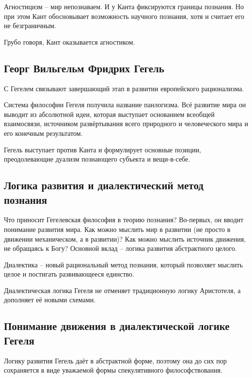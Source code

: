 \documentclass[main.tex]{subfiles}
\begin{document}

Агностицизм -- мир непознаваем.
И у Канта фиксируются границы познания.
Но при этом Кант обосновывает возможность научного познания, хотя и считает его не безграничным.

Грубо говоря, Кант оказывается агностиком.

\subsection{Георг Вильгельм Фридрих Гегель}


С Гегелем связывают завершающий этап в развитии европейского рационализма.

Система философии Гегеля получила название панлогизма.
Всё развитие мира он выводит из абсолютной идеи, которая выступает основанием всеобщей взаимосвязи, источником развёртывания всего природного и человеческого мира и его конечным результатом.

Гегель выступает против Канта и формулирует основные позиции, преодолевающие дуализм познающего субъекта и вещи-в-себе.

\subsection{Логика развития и диалектический метод познания}


Что приносит Гегелевская философия в теорию познания?
Во-первых, он вводит понимание развития мира.
Как можно мыслить мир в развитии (не просто в движении механическом, а в развитии)?
Как можно мыслить источник движения, не обращаясь к Богу?
Основной вклад -- логика развития абстрактного целого.

Диалектика -- новый рациональный метод познания, который позволяет мыслить целое и постигать развивающееся единство.

Диалектическая логика Гегеля не отменяет традиционную логику Аристотеля, а дополняет её новыми схемами.

\subsection{Понимание движения в диалектической логике Гегеля}


Логику развития Гегель даёт в абстрактной форме, поэтому она до сих пор сохраняется в виде уважаемой формы спекулятивного философствования.
\end{document}
